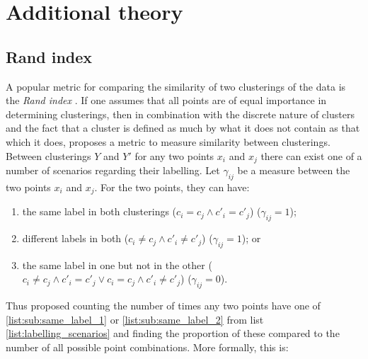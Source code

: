 \documentclass[12pt]{article} %
\begin{document}
	\newpage



%	
	
%	
	
%	
	
	

\newpage

\appendix

\section{Additional theory}

\subsection{Rand index} \label{sec:rand_index}
A popular metric for comparing the similarity of two clusterings of the data is the \emph{Rand index} \cite{RandObjectiveCriteriaEvaluation1971}. If one assumes that all points are of equal importance in determining clusterings, then in combination with the discrete nature of clusters and the fact that a cluster is defined as much by what it does not contain as that which it does, \citet{RandObjectiveCriteriaEvaluation1971} proposes a metric to measure similarity between clusterings. Between clusterings $Y$ and $Y'$ for any two points $x_i$ and $x_j$ there can exist one of a number of scenarios regarding their labelling. Let $\gamma_{ij}$ be a measure between the two points $x_i$ and $x_j$. For the two points, they can have:
\begin{enumerate} \label{list:labelling_scenarios}
	\item the same label in both clusterings ($c_i = c_j \land c'_i = c'_j$) ($\gamma_{ij}=1$); \label{list:sub:same_label_1}
	\item different labels in both ($c_i \neq c_j \land c'_i \neq c'_j$) ($\gamma_{ij}=1$); or \label{list:sub:same_label_2}
	\item the same label in one but not in the other ($c_i \neq c_j \land c'_i = c'_j \lor c_i = c_j \land c'_i \neq c'_j$) ($\gamma_{ij}=0$). \label{list:sub:different_label}
\end{enumerate}
Thus \citet{RandObjectiveCriteriaEvaluation1971} proposed counting the number of times any two points have one of \ref{list:sub:same_label_1} or \ref{list:sub:same_label_2} from list \ref{list:labelling_scenarios} and finding the proportion of these compared to the number of all possible point combinations. More formally, this is:
\end{document}

